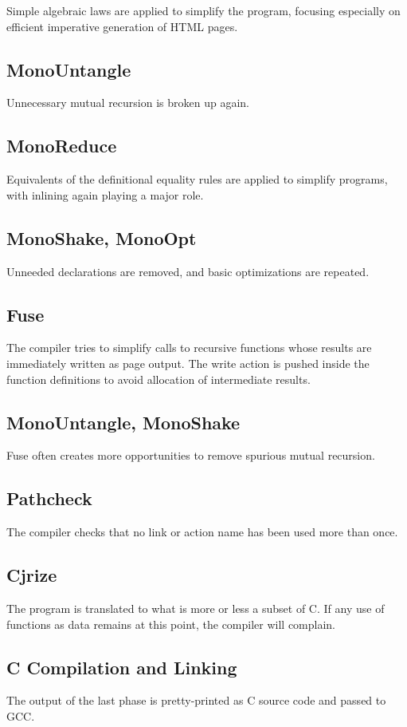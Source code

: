 \documentclass{article}
\begin{document}
Simple algebraic laws are applied to simplify the program, focusing especially on efficient imperative generation of HTML pages.

\subsection{MonoUntangle}

Unnecessary mutual recursion is broken up again.

\subsection{MonoReduce}

Equivalents of the definitional equality rules are applied to simplify programs, with inlining again playing a major role.

\subsection{MonoShake, MonoOpt}

Unneeded declarations are removed, and basic optimizations are repeated.

\subsection{Fuse}

The compiler tries to simplify calls to recursive functions whose results are immediately written as page output.  The write action is pushed inside the function definitions to avoid allocation of intermediate results.

\subsection{MonoUntangle, MonoShake}

Fuse often creates more opportunities to remove spurious mutual recursion.

\subsection{Pathcheck}

The compiler checks that no link or action name has been used more than once.

\subsection{Cjrize}

The program is translated to what is more or less a subset of C.  If any use of functions as data remains at this point, the compiler will complain.

\subsection{C Compilation and Linking}

The output of the last phase is pretty-printed as C source code and passed to GCC.
\end{document}
